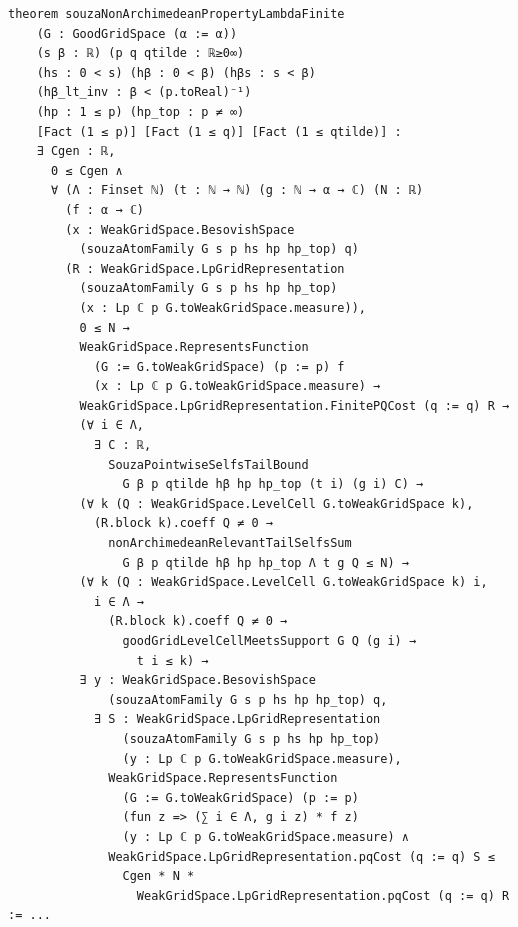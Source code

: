 \documentclass[11pt]{amsart}
\theoremstyle{definition}
\begin{document}
\begin{lstlisting}[style=lean,basicstyle=\ttfamily\scriptsize]
theorem souzaNonArchimedeanPropertyLambdaFinite
    (G : GoodGridSpace (α := α))
    (s β : ℝ) (p q qtilde : ℝ≥0∞)
    (hs : 0 < s) (hβ : 0 < β) (hβs : s < β)
    (hβ_lt_inv : β < (p.toReal)⁻¹)
    (hp : 1 ≤ p) (hp_top : p ≠ ∞)
    [Fact (1 ≤ p)] [Fact (1 ≤ q)] [Fact (1 ≤ qtilde)] :
    ∃ Cgen : ℝ,
      0 ≤ Cgen ∧
      ∀ (Λ : Finset ℕ) (t : ℕ → ℕ) (g : ℕ → α → ℂ) (N : ℝ)
        (f : α → ℂ)
        (x : WeakGridSpace.BesovishSpace
          (souzaAtomFamily G s p hs hp hp_top) q)
        (R : WeakGridSpace.LpGridRepresentation
          (souzaAtomFamily G s p hs hp hp_top)
          (x : Lp ℂ p G.toWeakGridSpace.measure)),
          0 ≤ N →
          WeakGridSpace.RepresentsFunction
            (G := G.toWeakGridSpace) (p := p) f
            (x : Lp ℂ p G.toWeakGridSpace.measure) →
          WeakGridSpace.LpGridRepresentation.FinitePQCost (q := q) R →
          (∀ i ∈ Λ,
            ∃ C : ℝ,
              SouzaPointwiseSelfsTailBound
                G β p qtilde hβ hp hp_top (t i) (g i) C) →
          (∀ k (Q : WeakGridSpace.LevelCell G.toWeakGridSpace k),
            (R.block k).coeff Q ≠ 0 →
              nonArchimedeanRelevantTailSelfsSum
                G β p qtilde hβ hp hp_top Λ t g Q ≤ N) →
          (∀ k (Q : WeakGridSpace.LevelCell G.toWeakGridSpace k) i,
            i ∈ Λ →
              (R.block k).coeff Q ≠ 0 →
                goodGridLevelCellMeetsSupport G Q (g i) →
                  t i ≤ k) →
          ∃ y : WeakGridSpace.BesovishSpace
              (souzaAtomFamily G s p hs hp hp_top) q,
            ∃ S : WeakGridSpace.LpGridRepresentation
                (souzaAtomFamily G s p hs hp hp_top)
                (y : Lp ℂ p G.toWeakGridSpace.measure),
              WeakGridSpace.RepresentsFunction
                (G := G.toWeakGridSpace) (p := p)
                (fun z => (∑ i ∈ Λ, g i z) * f z)
                (y : Lp ℂ p G.toWeakGridSpace.measure) ∧
              WeakGridSpace.LpGridRepresentation.pqCost (q := q) S ≤
                Cgen * N *
                  WeakGridSpace.LpGridRepresentation.pqCost (q := q) R := ...
\end{lstlisting}
\end{document}
